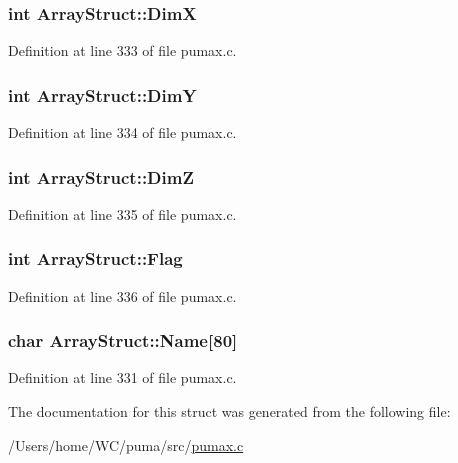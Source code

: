 \hypertarget{struct_array_struct_a51fc8e81440a7098077d179fca8d63b8}{
\subsubsection[{\-Dim\-X}]{\setlength{\rightskip}{0pt plus 5cm}int {\bf \-Array\-Struct\-::\-Dim\-X}}}
\label{struct_array_struct_a51fc8e81440a7098077d179fca8d63b8}


\-Definition at line 333 of file pumax.\-c.

\hypertarget{struct_array_struct_a73fc2a83ee5c78d73b0f4389a0771afb}{
\subsubsection[{\-Dim\-Y}]{\setlength{\rightskip}{0pt plus 5cm}int {\bf \-Array\-Struct\-::\-Dim\-Y}}}
\label{struct_array_struct_a73fc2a83ee5c78d73b0f4389a0771afb}


\-Definition at line 334 of file pumax.\-c.

\hypertarget{struct_array_struct_a53f6572c6d936b07f27d8d6fb9acb915}{
\subsubsection[{\-Dim\-Z}]{\setlength{\rightskip}{0pt plus 5cm}int {\bf \-Array\-Struct\-::\-Dim\-Z}}}
\label{struct_array_struct_a53f6572c6d936b07f27d8d6fb9acb915}


\-Definition at line 335 of file pumax.\-c.

\hypertarget{struct_array_struct_a00b2e20e7e3b5c5f3cf3e9e6cee16ca3}{
\subsubsection[{\-Flag}]{\setlength{\rightskip}{0pt plus 5cm}int {\bf \-Array\-Struct\-::\-Flag}}}
\label{struct_array_struct_a00b2e20e7e3b5c5f3cf3e9e6cee16ca3}


\-Definition at line 336 of file pumax.\-c.

\hypertarget{struct_array_struct_ae5bd936d5280e2021bdd3b61f51c31d4}{
\subsubsection[{\-Name}]{\setlength{\rightskip}{0pt plus 5cm}char {\bf \-Array\-Struct\-::\-Name}\mbox{[}80\mbox{]}}}
\label{struct_array_struct_ae5bd936d5280e2021bdd3b61f51c31d4}


\-Definition at line 331 of file pumax.\-c.



\-The documentation for this struct was generated from the following file\-:\begin{DoxyCompactItemize}
\item 
/\-Users/home/\-W\-C/puma/src/\hyperlink{pumax_8c}{pumax.\-c}\end{DoxyCompactItemize}
